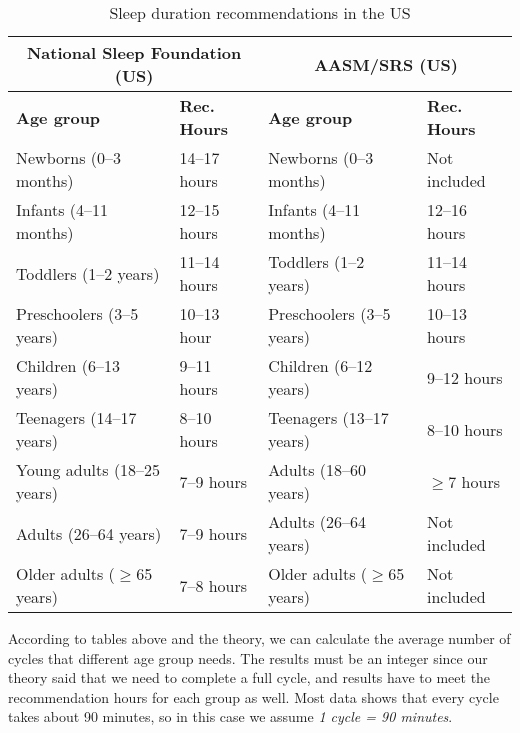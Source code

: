 \begin{table}[H]
\centering
\begin{tabular}{|l|l|l|l|}
\hline
\multicolumn{2}{|c|}{\textbf{National Sleep Foundation (US)}} &
\multicolumn{2}{|c|}{\textbf{AASM/SRS (US)}}\\
\hline
\textbf{Age group} & \textbf{Rec. Hours} &
\textbf{Age group} & \textbf{Rec. Hours}\\ \hline
Newborns (0–3 months) & 14–17 hours & Newborns (0–3 months) & Not included\\ \hline
Infants (4–11 months) &	12–15 hours & Infants (4–11 months)	& 12–16 hours\\ \hline
Toddlers (1–2 years) & 11–14 hours & Toddlers (1–2 years) & 11–14 hours\\ \hline
Preschoolers (3–5 years) & 10–13 hour & Preschoolers (3–5 years) & 10–13 hours\\ \hline
Children (6–13 years) & 9–11 hours & Children (6–12 years) & 9–12 hours\\ \hline
Teenagers (14–17 years) & 8–10 hours & Teenagers (13–17 years) & 8–10 hours\\ \hline
Young adults (18–25 years) & 7–9 hours & Adults (18–60 years) & $\geq$7 hours\\ \hline
Adults (26–64 years) & 7–9 hours & Adults (26–64 years) & Not included\\ \hline
Older adults ($\geq$65 years) & 7–8 hours & Older adults ($\geq$65 years) & Not included\\ \hline
\end{tabular}
\caption{Sleep duration recommendations in the US}
\label{tab:my_label_with_H_tag}
\end{table}

According to tables above and the theory, we can calculate the average number of cycles that different age group needs. The results must be an integer since our theory said that we need to complete a full cycle, and results have to meet the recommendation hours for each group as well. Most data shows that every cycle takes about 90 minutes, so in this case we assume \textit{1 cycle = 90 minutes}.

